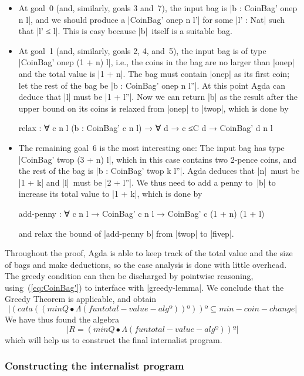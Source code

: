 \begin{itemize}
\item At goal~0 (and, similarly, goals 3 and~7), the input bag is |b : CoinBag' onep n l|, and we should produce a |CoinBag' onep n l'| for some |l' : Nat| such that |l' ≤ l|.
This is easy because |b|~itself is a suitable bag.
\item At goal~1 (and, similarly, goals 2, 4, and~5), the input bag is of type |CoinBag' onep (1 + n) l|, i.e., the coins in the bag are no larger than |onep| and the total value is |1 + n|.
The bag must contain |onep| as its first coin; let the rest of the bag be |b : CoinBag' onep n l''|.
At this point Agda can deduce that |l| must be |1 + l''|.
Now we can return |b| as the result after the upper bound on its coins is relaxed from |onep| to |twop|, which is done by
\begin{code}
relax :  ∀ {c n l} (b : CoinBag' c n l) →
         ∀ {d} → c ≤C d → CoinBag' d n l
\end{code}
\item The remaining goal~6 is the most interesting one:
The input bag has type |CoinBag' twop (3 + n) l|, which in this case contains two 2-pence coins, and the rest of the bag is |b : CoinBag' twop k l''|.
Agda deduces that |n|~must be |1 + k| and |l|~must be |2 + l''|.
We thus need to add a penny to~|b| to increase its total value to |1 + k|, which is done by
\begin{code}add-penny :
  ∀ {c n l} → CoinBag' c n l → CoinBag' c (1 + n) (1 + l)
\end{code}
and relax the bound of |add-penny b| from |twop| to |fivep|.
\end{itemize}
Throughout the proof, Agda is able to keep track of the total value and the size of bags and make deductions, so the case analysis is done with little overhead.
The greedy condition can then be discharged by pointwise reasoning, using~(\ref{eq:CoinBag'}) to interface with |greedy-lemma|.
We conclude that the Greedy Theorem is applicable, and obtain
\[ |(cata((min Q •Λ (fun total-value-alg º)) º)) º ⊆ min-coin-change| \]
We have thus found the algebra
\[ |R = (min Q •Λ (fun total-value-alg º)) º| \]
which will help us to construct the final internalist program.

\subsubsection{Constructing the internalist program}

